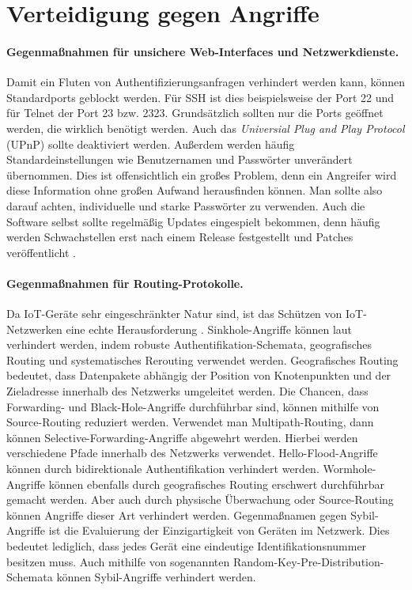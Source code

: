 \section{Verteidigung gegen Angriffe}\label{sec:defense-against-attacks}

\paragraph{Gegenmaßnahmen für unsichere Web-Interfaces und Netzwerkdienste.}
Damit ein Fluten von Authentifizierungsanfragen verhindert werden kann, können
Standardports geblockt werden. Für SSH ist dies beispielsweise der Port 22 und
für Telnet der Port 23 bzw. 2323. Grundsätzlich sollten nur die Ports geöffnet
werden, die wirklich benötigt werden. Auch das \textit{Universial Plug and Play
Protocol} (UPnP) sollte deaktiviert werden. Außerdem werden häufig
Standardeinstellungen wie Benutzernamen und Passwörter unverändert übernommen.
Dies ist offensichtlich ein großes Problem, denn ein Angreifer wird diese
Information ohne großen Aufwand herausfinden können. Man sollte also darauf
achten, individuelle und starke Passwörter zu verwenden. Auch die Software
selbst sollte regelmäßig Updates eingespielt bekommen, denn häufig werden
Schwachstellen erst nach einem Release festgestellt und Patches veröffentlicht
\cite{paper}.

\paragraph{Gegenmaßnahmen für Routing-Protokolle.}
Da IoT-Geräte sehr eingeschränkter Natur sind, ist das Schützen von
IoT-Netzwerken eine echte Herausforderung \cite{patel2016}. Sinkhole-Angriffe
können laut \cite{paper} verhindert werden, indem robuste
Authentifikation-Schemata, geografisches Routing und systematisches Rerouting
verwendet werden.  Geografisches Routing bedeutet, dass Datenpakete abhängig der
Position von Knotenpunkten und der Zieladresse innerhalb des Netzwerks
umgeleitet werden.  Die Chancen, dass Forwarding- und Black-Hole-Angriffe
durchführbar sind, können mithilfe von Source-Routing reduziert werden.
Verwendet man Multipath-Routing, dann können Selective-Forwarding-Angriffe
abgewehrt werden. Hierbei werden verschiedene Pfade innerhalb des Netzwerks
verwendet. Hello-Flood-Angriffe können durch bidirektionale Authentifikation
verhindert werden.  Wormhole-Angriffe können ebenfalls durch geografisches
Routing erschwert durchführbar gemacht werden. Aber auch durch physische
Überwachung oder Source-Rou\-ting können Angriffe dieser Art verhindert werden.
Gegenmaßnamen gegen Sybil-Angriffe ist die Evaluierung der Einzigartigkeit von
Geräten im Netzwerk.  Dies bedeutet lediglich, dass jedes Gerät eine eindeutige
Identifikationsnummer besitzen muss. Auch mithilfe von sogenannten
Random-Key-Pre-Dis\-tri\-bu\-tion-Schemata \cite{chan2003} können Sybil-Angriffe
verhindert werden.

